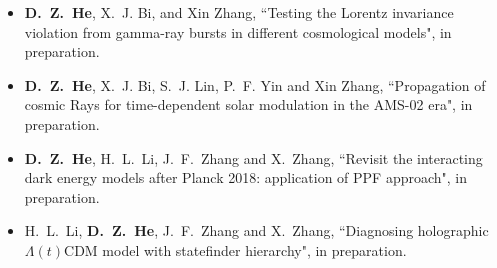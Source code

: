   \begin{itemize}[leftmargin=*]
    \item \textbf{D.~Z.~He}, X.~J. Bi, and Xin Zhang, ``Testing the Lorentz invariance violation from gamma-ray bursts in different cosmological models", in preparation.

    \item \textbf{D.~Z.~He}, X.~J. Bi, S.~J. Lin, P.~F. Yin and Xin Zhang, ``Propagation of cosmic Rays for time-dependent solar modulation in the AMS-02 era", in preparation.
      
    \item \textbf{D.~Z.~He}, H.~L.~Li, J.~F.~Zhang and X.~Zhang, ``Revisit the interacting dark energy models after Planck 2018: application of PPF approach", in preparation.  
    
    \item H.~L.~Li, \textbf{D.~Z.~He}, J.~F.~Zhang and X.~Zhang, ``Diagnosing holographic $\Lambda(t)$CDM model with statefinder hierarchy", in preparation.
    \end{itemize}